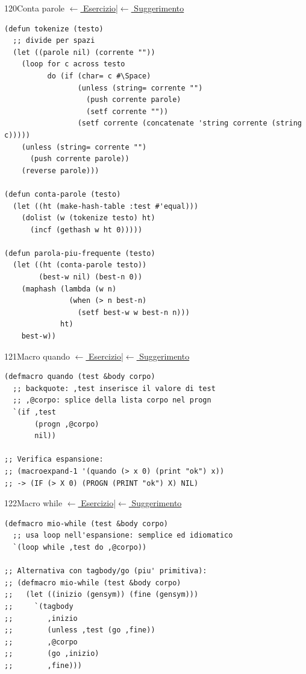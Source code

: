 \label{sol:120}
\begin{solbox}{120}{Conta parole}
\small\color{black!55}\hyperref[ex:120]{$\leftarrow$ Esercizio}\enspace\textcolor{black!30}{|}\enspace\hyperref[hint:120]{$\leftarrow$ Suggerimento}\normalsize\color{black}
\begin{lstlisting}
(defun tokenize (testo)
  ;; divide per spazi
  (let ((parole nil) (corrente ""))
    (loop for c across testo
          do (if (char= c #\Space)
                 (unless (string= corrente "")
                   (push corrente parole)
                   (setf corrente ""))
                 (setf corrente (concatenate 'string corrente (string c)))))
    (unless (string= corrente "")
      (push corrente parole))
    (reverse parole)))

(defun conta-parole (testo)
  (let ((ht (make-hash-table :test #'equal)))
    (dolist (w (tokenize testo) ht)
      (incf (gethash w ht 0)))))

(defun parola-piu-frequente (testo)
  (let ((ht (conta-parole testo))
        (best-w nil) (best-n 0))
    (maphash (lambda (w n)
               (when (> n best-n)
                 (setf best-w w best-n n)))
             ht)
    best-w))
\end{lstlisting}
\end{solbox}


\label{sol:121}
\begin{solbox}{121}{Macro quando}
\small\color{black!55}\hyperref[ex:121]{$\leftarrow$ Esercizio}\enspace\textcolor{black!30}{|}\enspace\hyperref[hint:121]{$\leftarrow$ Suggerimento}\normalsize\color{black}
\begin{lstlisting}
(defmacro quando (test &body corpo)
  ;; backquote: ,test inserisce il valore di test
  ;; ,@corpo: splice della lista corpo nel progn
  `(if ,test
       (progn ,@corpo)
       nil))

;; Verifica espansione:
;; (macroexpand-1 '(quando (> x 0) (print "ok") x))
;; -> (IF (> X 0) (PROGN (PRINT "ok") X) NIL)
\end{lstlisting}
\end{solbox}

\label{sol:122}
\begin{solbox}{122}{Macro while}
\small\color{black!55}\hyperref[ex:122]{$\leftarrow$ Esercizio}\enspace\textcolor{black!30}{|}\enspace\hyperref[hint:122]{$\leftarrow$ Suggerimento}\normalsize\color{black}
\begin{lstlisting}
(defmacro mio-while (test &body corpo)
  ;; usa loop nell'espansione: semplice ed idiomatico
  `(loop while ,test do ,@corpo))

;; Alternativa con tagbody/go (piu' primitiva):
;; (defmacro mio-while (test &body corpo)
;;   (let ((inizio (gensym)) (fine (gensym)))
;;     `(tagbody
;;        ,inizio
;;        (unless ,test (go ,fine))
;;        ,@corpo
;;        (go ,inizio)
;;        ,fine)))
\end{lstlisting}
\end{solbox}

